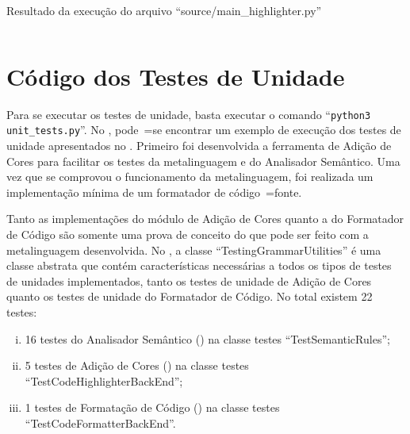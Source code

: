 \begin{code}
\caption{Resultado da execução do arquivo ``source/main\_highlighter.py''}
\label{MainHighlighterPyResult}
\inputminted{text}{aftertext/main_highlighter_output.txt}
\end{code}


\chapter[Testes de Unidade]{Código dos Testes de Unidade}

Para se executar os testes de unidade,
basta executar o comando ``\texttt{python3 unit_tests.py}''.
No ,
pode~=se encontrar um exemplo de execução dos testes de unidade apresentados no .
Primeiro foi desenvolvida a ferramenta de Adição de Cores para facilitar os testes da metalinguagem e
do Analisador Semântico.
Uma vez que se comprovou o funcionamento da metalinguagem,
foi realizada um implementação mínima de um formatador de código~=fonte.

Tanto as implementações do módulo de Adição de Cores quanto a do Formatador de Código são somente uma prova de conceito do que pode ser feito com a metalinguagem desenvolvida.
No ,
a classe ``TestingGrammarUtilities'' é uma classe abstrata \cite{understandingDataAbstraction} que contém características necessárias a todos os tipos de testes de unidades implementados,
tanto os testes de unidade de Adição de Cores quanto os testes de unidade do Formatador de Código.
No total existem 22 testes:
\begin{enumerate}[i)]
\item 16 testes do Analisador Semântico () na classe testes ``TestSemanticRules'';
\item 5 testes de Adição de Cores () na classe testes ``TestCodeHighlighterBackEnd'';
\item 1 testes de Formatação de Código () na classe testes ``TestCodeFormatterBackEnd''.
\end{enumerate}%

